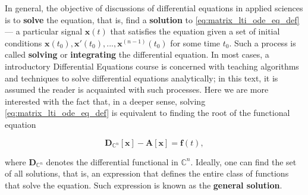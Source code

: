 	In general, the objective of discussions of differential equations in applied sciences is to \textbf{solve} the equation, that is, find a \textbf{solution} to \eqref{eq:matrix_lti_ode_eq_def} — a particular signal $\mathbf{x}(t)$ that satisfies the equation given a set of initial conditions $\mathbf{x}\left(t_0\right),\mathbf{x}'\left(t_0\right),...,\mathbf{x}^{(n-1)}\left(t_0\right)$ for some time $t_0$. Such a process is called \textbf{solving} or \textbf{integrating} the differential equation. In most cases, a introductory Differential Equations course is concerned with teaching algorithms and techniques to solve differential equations analytically; in this text, it is assumed the reader is acquainted with such processes. Here we are more interested with the fact that, in a deeper sense, solving \eqref{eq:matrix_lti_ode_eq_def} is equivalent to finding the root of the functional equation

\begin{equation} \mathbf{D}_{\mathbb{C}^n}\left[\mathbf{x}\right] - \mathbf{A}\left[\mathbf{x}\right] = \mathbf{f}(t),  \label{eq:equivalent_lti_ode_operator} \end{equation}

	\noindent where $\mathbf{D}_{\mathbb{C}^n}$ denotes the differential functional in $\mathbb{C}^n$.  Ideally, one can find the set of all solutions, that is, an expression that defines the entire class of functions that solve the equation. Such expression is known as the \textbf{general solution}. 

